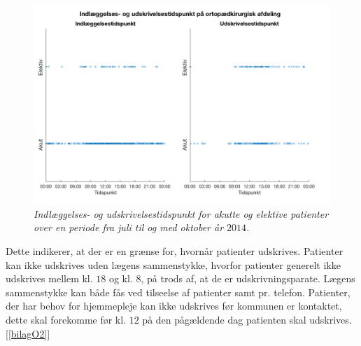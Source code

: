 \begin{figure}[H]
	\centering
	\includegraphics[scale=0.35]{figures/indlaegudskriv.png}
	\caption{\textit{Indlæggelses- og udskrivelsestidspunkt for akutte og elektive patienter over en periode fra juli til og med oktober år $2014$.}\cite{REOS}}
	\label{indlaegudskriv}
	\end{figure}
	
\noindent
Dette indikerer, at der er en grænse for, hvornår patienter udskrives. Patienter kan ikke udskrives uden lægens sammenstykke, hvorfor patienter generelt ikke udskrives mellem kl. $18$ og kl. $8$, på trods af, at de er udskrivningsparate. Lægens sammenstykke kan både fås ved tilseelse af patienter samt pr. telefon. Patienter, der har behov for hjemmepleje kan ikke udskrives før kommunen er kontaktet, dette skal forekomme før kl. $12$ på den pågældende dag patienten skal udskrives.[\ref{bilagO2}]

